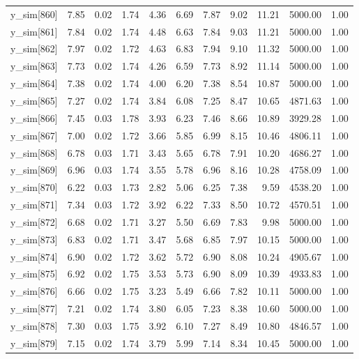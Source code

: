 \begin{table}[ht]
\begin{tabular}{rrrrrrrrrrr}
  y\_sim[860] & 7.85 & 0.02 & 1.74 & 4.36 & 6.69 & 7.87 & 9.02 & 11.21 & 5000.00 & 1.00 \\ 
  y\_sim[861] & 7.84 & 0.02 & 1.74 & 4.48 & 6.63 & 7.84 & 9.03 & 11.21 & 5000.00 & 1.00 \\ 
  y\_sim[862] & 7.97 & 0.02 & 1.72 & 4.63 & 6.83 & 7.94 & 9.10 & 11.32 & 5000.00 & 1.00 \\ 
  y\_sim[863] & 7.73 & 0.02 & 1.74 & 4.26 & 6.59 & 7.73 & 8.92 & 11.14 & 5000.00 & 1.00 \\ 
  y\_sim[864] & 7.38 & 0.02 & 1.74 & 4.00 & 6.20 & 7.38 & 8.54 & 10.87 & 5000.00 & 1.00 \\ 
  y\_sim[865] & 7.27 & 0.02 & 1.74 & 3.84 & 6.08 & 7.25 & 8.47 & 10.65 & 4871.63 & 1.00 \\ 
  y\_sim[866] & 7.45 & 0.03 & 1.78 & 3.93 & 6.23 & 7.46 & 8.66 & 10.89 & 3929.28 & 1.00 \\ 
  y\_sim[867] & 7.00 & 0.02 & 1.72 & 3.66 & 5.85 & 6.99 & 8.15 & 10.46 & 4806.11 & 1.00 \\ 
  y\_sim[868] & 6.78 & 0.03 & 1.71 & 3.43 & 5.65 & 6.78 & 7.91 & 10.20 & 4686.27 & 1.00 \\ 
  y\_sim[869] & 6.96 & 0.03 & 1.74 & 3.55 & 5.78 & 6.96 & 8.16 & 10.28 & 4758.09 & 1.00 \\ 
  y\_sim[870] & 6.22 & 0.03 & 1.73 & 2.82 & 5.06 & 6.25 & 7.38 & 9.59 & 4538.20 & 1.00 \\ 
  y\_sim[871] & 7.34 & 0.03 & 1.72 & 3.92 & 6.22 & 7.33 & 8.50 & 10.72 & 4570.51 & 1.00 \\ 
  y\_sim[872] & 6.68 & 0.02 & 1.71 & 3.27 & 5.50 & 6.69 & 7.83 & 9.98 & 5000.00 & 1.00 \\ 
  y\_sim[873] & 6.83 & 0.02 & 1.71 & 3.47 & 5.68 & 6.85 & 7.97 & 10.15 & 5000.00 & 1.00 \\ 
  y\_sim[874] & 6.90 & 0.02 & 1.72 & 3.62 & 5.72 & 6.90 & 8.08 & 10.24 & 4905.67 & 1.00 \\ 
  y\_sim[875] & 6.92 & 0.02 & 1.75 & 3.53 & 5.73 & 6.90 & 8.09 & 10.39 & 4933.83 & 1.00 \\ 
  y\_sim[876] & 6.66 & 0.02 & 1.75 & 3.23 & 5.49 & 6.66 & 7.82 & 10.11 & 5000.00 & 1.00 \\ 
  y\_sim[877] & 7.21 & 0.02 & 1.74 & 3.80 & 6.05 & 7.23 & 8.38 & 10.60 & 5000.00 & 1.00 \\ 
  y\_sim[878] & 7.30 & 0.03 & 1.75 & 3.92 & 6.10 & 7.27 & 8.49 & 10.80 & 4846.57 & 1.00 \\ 
  y\_sim[879] & 7.15 & 0.02 & 1.74 & 3.79 & 5.99 & 7.14 & 8.34 & 10.45 & 5000.00 & 1.00 \\ 

\end{tabular}
\end{table}
